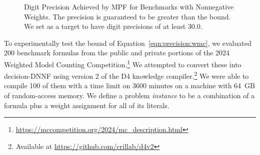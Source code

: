 \documentclass[letterpaper,USenglish,cleveref, autoref, thm-restate]{lipics-v2021}
\begin{document}
\begin{figure}
\caption{Digit Precision Achieved by MPF for Benchmarks with Nonnegative Weights.  The precision is guaranteed to be greater than the bound.
We set as a target to have digit precisions of at least 30.0.}
\label{fig:pos:mpf}
\end{figure}

To experimentally test the bound of Equation~\ref{eqn:precision:wmc},
we evaluated 200 benchmark formulas from the public and private portions
of the 2024 Weighted Model Counting Competition.\footnote{\url{https://mccompetition.org/2024/mc_description.html}}  We attempted to
convert these into decision-DNNF using version 2 of the D4
knowledge compiler.\footnote{
Available at \url{https://github.com/crillab/d4v2}}
We were able to compile 100 of them with a time
limit on 3600 minutes on a machine with 64~GB of random-access memory.
We define a problem \emph{instance} to be a combination of a formula
plus a weight assignment for all of its literals.
\end{document}
